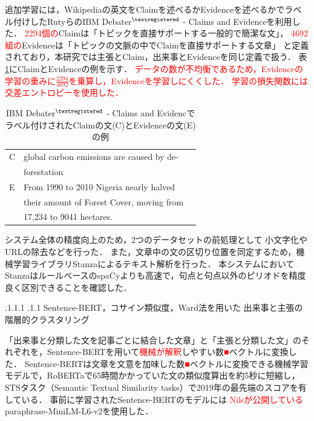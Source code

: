 \documentclass[a4paper, twocolumn, 10pt]{jarticle}
\makeatletter
\def\subsection{%
	\@startsection{subsection}{1}{\z@}%
	{.1\Cvs \@plus.1\Cdp \@minus.1\Cdp}%
	{.1\Cvs \@plus.1\Cdp}%
	{\normalfont\normalsize\bfseries}%
}
\makeatother
\begin{document}
追加学習には，Wikipediaの英文をClaimを述べるかEvidenceを述べるかでラベル付けしたRutyらのIBM Debater$^{\textregistered}$ - Claims and Evidenceを利用した\cite{rinott_show_2015}．
\textcolor{red}{2294個の}Claimは「トピックを直接サポートする一般的で簡潔な文」，
\textcolor{red}{4692組の}Evidenceは「トピックの文脈の中でClaimを直接サポートする文章」
と定義されており，本研究では主張とClaim，出来事とEvidenceを同じ定義で扱う．
表\ref{claim_evidence_example}にClaimとEvidenceの例を示す．
\textcolor{red}{
  データの数が不均衡であるため，Evidenceの学習の重みに$\frac{2294}{4692}$を乗算し，Evidenceを学習しにくくした．
  学習の損失関数には交差エントロピーを使用した．
}

\begin{table}[H]
  \caption{IBM Debater$^{\textregistered}$ - Claims and Evidencでラベル付けされたClaimの文(C)とEvidenceの文(E)の例}
  \centering
  \begin{tabular}{llp{6cm}}
    \hline
    C & global carbon emissions are caused by de-
    \\
    & forestation
    \\
    E & From 1990 to 2010 Nigeria nearly halved
    \\
    & their amount of Forest Cover, moving from
    \\
    & 17,234 to 9041 hectares.
    \\
    \hline
  \end{tabular}
  \label{claim_evidence_example}
\end{table}

システム全体の精度向上のため，2つのデータセットの前処理として
小文字化やURLの除去などを行った．
また，文章中の文の区切り位置を同定するため，機械学習ライブラリStanzaによるテキスト解析を行った\cite{qi_stanza_2020}．
本システムにおいてStanzaはルールベースのspaCyよりも高速で，句点と句点以外のピリオドを精度良く区別できることを確認した．



\subsection{
Sentence-BERT，コサイン類似度，Ward法を用いた
出来事と主張の
階層的クラスタリング
}

「出来事と分類した文を記事ごとに結合した文章」と「主張と分類した文」のそれぞれを，Sentence-BERTを用いて\textcolor{red}{機械が解釈}しやすい数\textcolor{red}{■}ベクトルに変換した．
Sentence-BERTは文章を文意を加味した数\textcolor{red}{■}ベクトルに変換できる機械学習モデルで，RoBERTaで65時間かかっていた文の類似度算出を約5秒に短縮し，STSタスク（Semantic Textual Similarity tasks）で2019年の最先端のスコアを有している\cite{reimers_sentence-bert_2019}．
事前に学習されたSentence-BERTのモデルには
\textcolor{red}{Nilsが公開している}paraphrase-MiniLM-L6-v2を使用した．
\end{document}
